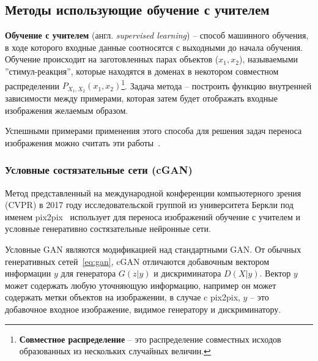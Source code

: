 \documentclass[11pt,a4paper]{extarticle}
\begin{document}
	\subsection{Методы использующие обучение с учителем}
	
		\textbf{Обучение с учителем} (англ. \textit{supervised learning}) -- способ машинного обучения, в ходе которого входные данные соотносятся с выходными до начала обучения.
		Обучение происходит на заготовленных парах объектов (\(x_{1},x_{2}\)), называемыми ''стимул-реакция'', которые находятся в доменах в некотором совместном распределении \(P_{X_{1},X_{2}}(x_{1},x_{2})\)\footnote{
			\textbf{Совместное распределение} -- это распределение совместных исходов образованных из нескольких случайных величин.
		}.
		Задача метода -- построить функцию внутренней зависимости между примерами, которая затем будет отображать входные изображения желаемым образом.

		Успешными примерами применения этого способа для решения задач переноса изображения можно считать эти работы~\cite{BicycleGAN, pix2pix}.

		\subsubsection{Условные состязательные сети (cGAN)} \label{sec:pix2pix}

			Метод представленный на международной конференции компьютерного зрения (CVPR) в 2017 году
			исследовательской группой из университета Беркли под именем pix2pix~\cite{pix2pix}
			использует для переноса изображений обучение с учителем и условные генеративно состязательные нейронные сети.

			Условные GAN являются модификацией над стандартными GAN.
			От обычных генеративных сетей~\eqref{eq:gan}, cGAN отличаются добавочным вектором информации $y$ для генератора \(G(z|y)\) и дискриминатора \(D(X|y)\).
			Вектор $y$ может содержать любую уточняющую информацию, например он может содержать метки объектов на изображении,
			в случае c pix2pix, $y$ -- это добавочное входное изображение, видимое генератору и дискриминатору.
\end{document}
